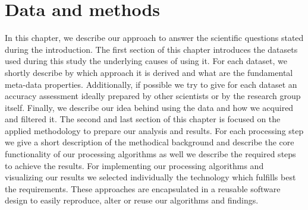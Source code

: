 \chapter{Data and methods}
\label{ch:data_methods}
	In this chapter, we describe our approach to answer the scientific questions stated during the introduction. The first section of this chapter introduces the datasets used during this study the underlying causes of using it. For each dataset, we shortly describe by which approach it is derived and what are the fundamental meta-data properties. Additionally, if possible we try to give for each dataset an accuracy assessment ideally prepared by other scientists or by the research group itself. Finally, we describe our idea behind using the data and how we acquired and filtered it. The second and last section of this chapter is focused on the applied methodology to prepare our analysis and results. For each processing step we give a short description of the methodical background and describe the core functionality of our processing algorithms as well we describe the required steps to achieve the results. For implementing our processing algorithms and visualizing our results we selected individually the technology which fulfills best the requirements. These approaches are encapsulated in a reusable software design to easily reproduce, alter or reuse our algorithms and findings.

